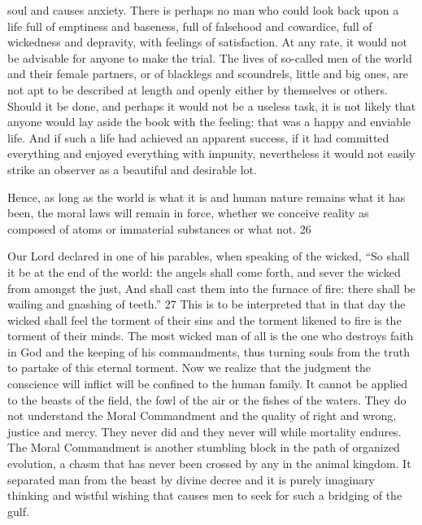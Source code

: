 soul and causes anxiety. There is perhaps no man who could look back upon a life full of
emptiness and baseness, full of falsehood and cowardice, full of wickedness and depravity,
with feelings of satisfaction. At any rate, it would not be advisable for anyone to make the
trial. The lives of so-called men of the world and their female partners, or of blacklegs and
scoundrels, little and big ones, are not apt to be described at length and openly either by
themselves or others. Should it be done, and perhaps it would not be a useless task, it is not
likely that anyone would lay aside the book with the feeling: that was a happy and enviable
life. And if such a life had achieved an apparent success, if it had committed everything and
enjoyed everything with impunity, nevertheless it would not easily strike an observer as a
beautiful and desirable lot.

Hence, as long as the world is what it is and human nature remains what it has been, the
moral laws will remain in force, whether we conceive reality as composed of atoms or
immaterial substances or what not. 26

Our Lord declared in one of his parables, when speaking of the wicked, ``So shall it be at the
end of the world: the angels shall come forth, and sever the wicked from amongst the just,
And shall cast them into the furnace of fire: there shall be wailing and gnashing of teeth.'' 27
This is to be interpreted that in that day the wicked shall feel the torment of their sins and the
torment likened to fire is the torment of their minds. The most wicked man of all is the one
who destroys faith in God and the keeping of his commandments, thus turning souls from the
truth to partake of this eternal torment. Now we realize that the judgment the conscience will
inflict will be confined to the human family. It cannot be applied to the beasts of the field, the
fowl of the air or the fishes of the waters. They do not understand the Moral Commandment
and the quality of right and wrong, justice and mercy. They never did and they never will
while mortality endures. The Moral Commandment is another stumbling block in the path of
organized evolution, a chasm that has never been crossed by any in the animal kingdom. It
separated man from the beast by divine decree and it is purely imaginary thinking and wistful
wishing that causes men to seek for such a bridging of the gulf.

